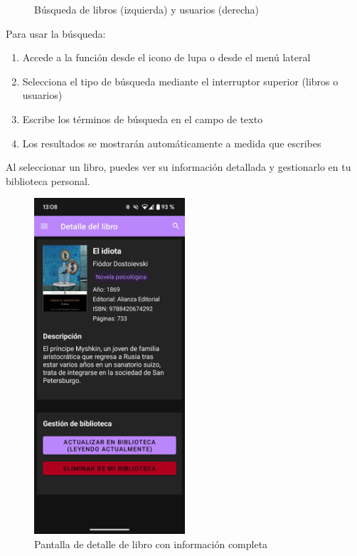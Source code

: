 \documentclass[a4paper,12pt]{report}
\begin{document}
\begin{figure}[H]
      \caption{Búsqueda de libros (izquierda) y usuarios (derecha)}
      \label{fig:busqueda}
    \end{figure}
    
    Para usar la búsqueda:
    \begin{enumerate}
      \item Accede a la función desde el icono de lupa o desde el menú lateral
      \item Selecciona el tipo de búsqueda mediante el interruptor superior (libros o usuarios)
      \item Escribe los términos de búsqueda en el campo de texto
      \item Los resultados se mostrarán automáticamente a medida que escribes
    \end{enumerate}
    
    
      Al seleccionar un libro, puedes ver su información detallada y gestionarlo en tu biblioteca personal.
    
      \begin{figure}[H]
        \centering
        \includegraphics[width=0.5\textwidth]{.img/libro.png}
        \caption{Pantalla de detalle de libro con información completa}
        \label{fig:libro}
      \end{figure}
      
\end{document}
